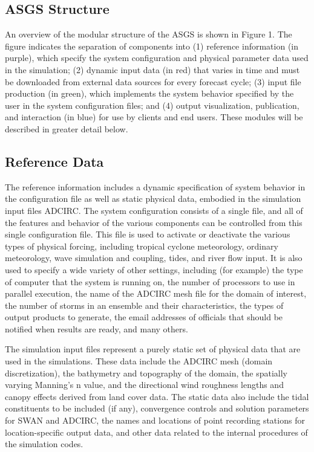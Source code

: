 \documentclass[12pt]{article}
\begin{document}
\subsection{ASGS Structure}

An overview of the modular structure of the ASGS is shown in Figure 
1. The figure indicates the separation of components into (1) 
reference information (in purple), which specify the system 
configuration and physical parameter data used in the simulation; 
(2) dynamic input data (in red) that varies in time and must be 
downloaded from external data sources for every forecast cycle; (3) 
input file production (in green), which implements the system 
behavior specified by the user in the system configuration files; 
and (4) output visualization, publication, and interaction (in blue) 
for use by clients and end users. These modules will be described in 
greater detail below. 

\subsection{Reference Data}

The reference information includes a dynamic specification of system 
behavior in the configuration file as well as static physical data, 
embodied in the simulation input files ADCIRC. The system 
configuration consists of a single file, and all of the features and 
behavior of the various components can be controlled from this 
single configuration file. This file is used to activate or 
deactivate the various types of physical forcing, including tropical 
cyclone meteorology, ordinary meteorology, wave simulation and 
coupling, tides, and river flow input. It is also used to specify a 
wide variety of other settings, including (for example) the type of 
computer that the system is running on, the number of processors to 
use in parallel execution, the name of the ADCIRC mesh file for the 
domain of interest, the number of storms in an ensemble and their 
characteristics, the types of output products to generate, the email 
addresses of officials that should be notified when results are 
ready, and many others. 

The simulation input files represent a purely static set of physical 
data that are used in the simulations. These data include the ADCIRC 
mesh (domain discretization), the bathymetry and topography of the 
domain, the spatially varying Manning's n value, and the directional 
wind roughness lengths and canopy effects derived from land cover 
data. The static data also include the tidal constituents to be 
included (if any), convergence controls and solution parameters for 
SWAN and ADCIRC, the names and locations of point recording stations 
for location-specific output data, and other data related to the 
internal procedures of the simulation codes. 
\end{document}
